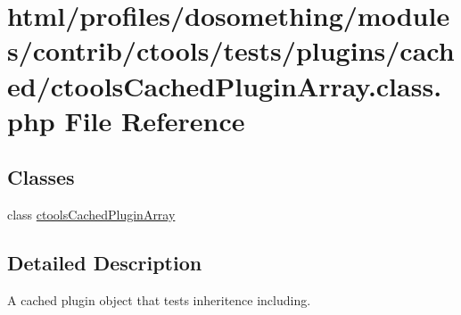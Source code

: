 \hypertarget{ctoolsCachedPluginArray_8class_8php}{
\section{html/profiles/dosomething/modules/contrib/ctools/tests/plugins/cached/ctoolsCachedPluginArray.class.php File Reference}
\label{ctoolsCachedPluginArray_8class_8php}
}
\subsection*{Classes}
\begin{DoxyCompactItemize}
\item 
class \hyperlink{classctoolsCachedPluginArray}{ctoolsCachedPluginArray}
\end{DoxyCompactItemize}


\subsection{Detailed Description}
A cached plugin object that tests inheritence including. 